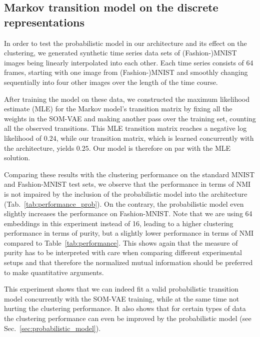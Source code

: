 \FloatBarrier

\subsection{Markov transition model on the discrete representations}

In order to test the probabilistic model in our architecture and its effect on the clustering, we generated synthetic time series data sets of (Fashion-)MNIST images being linearly interpolated into each other.
Each time series consists of 64 frames, starting with one image from \mbox{(Fashion-)MNIST} and smoothly changing sequentially into four other images over the length of the time course.

After training the model on these data, we constructed the maximum likelihood estimate (MLE) for the Markov model's transition matrix by fixing all the weights in the SOM-VAE and making another pass over the training set, counting all the observed transitions.
This MLE transition matrix reaches a negative log likelihood of $0.24$, while our transition matrix, which is learned concurrently with the architecture, yields $0.25$.
Our model is therefore on par with the MLE solution.

Comparing these results with the clustering performance on the standard MNIST and Fashion-MNIST test sets, we observe that the performance in terms of NMI is not impaired by the inclusion of the probabilistic model into the architecture (Tab.~\ref{tab:performance_prob}).
On the contrary, the probabilistic model even slightly increases the performance on Fashion-MNIST.
Note that we are using 64 embeddings in this experiment instead of 16, leading to a higher clustering performance in terms of purity, but a slightly lower performance in terms of NMI compared to Table~\ref{tab:performance}.
This shows again that the measure of purity has to be interpreted with care when comparing different experimental setups and that therefore the normalized mutual information should be preferred to make quantitative arguments.

This experiment shows that we can indeed fit a valid probabilistic transition model concurrently with the SOM-VAE training, while at the same time not hurting the clustering performance.
It also shows that for certain types of data the clustering performance can even be improved by the probabilistic model (see Sec.~\ref{sec:probabilistic_model}).

